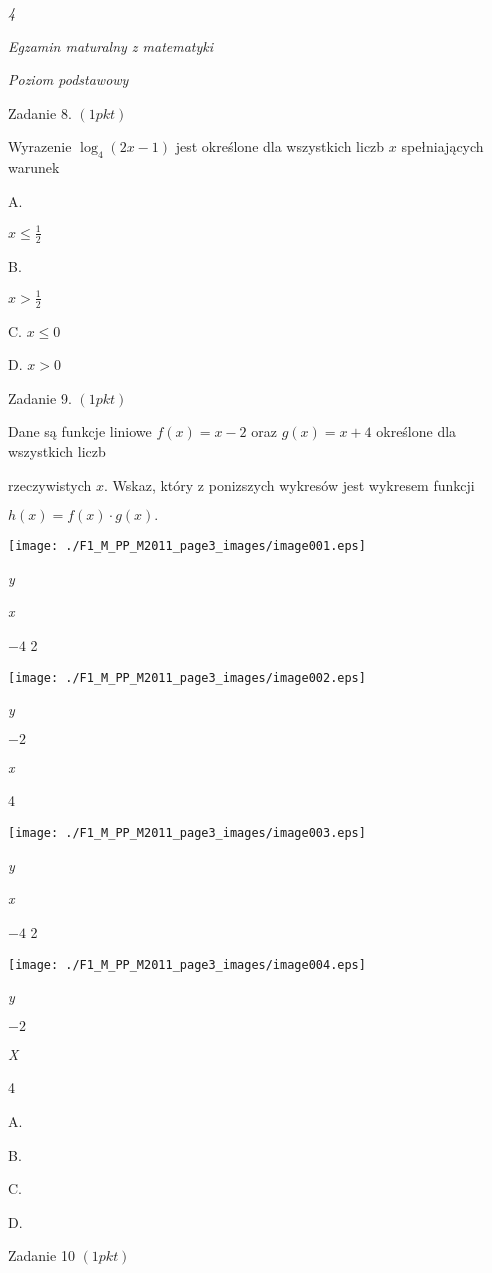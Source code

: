 \documentclass[a4paper,12pt]{article}
\begin{document}
{\it 4}

{\it Egzamin maturalny z matematyki}

{\it Poziom podstawowy}

Zadanie 8. $(1pkt)$

Wyrazenie $\log_{4}(2x-1)$ jest określone dla wszystkich liczb $x$ spełniających warunek

A.

$x\displaystyle \leq\frac{1}{2}$

B.

$x>\displaystyle \frac{1}{2}$

C. $x\leq 0$

D. $x>0$

Zadanie 9. $(1pkt)$

Dane są funkcje liniowe $f(x)=x-2$ oraz $g(x)=x+4$ określone dla wszystkich liczb

rzeczywistych $x$. Wskaz, który z ponizszych wykresów jest wykresem funkcji

$h(x)=f(x)\cdot g(x).$
\begin{center}
\texttt{[image: ./F1\_M\_PP\_M2011\_page3\_images/image001.eps]}
\end{center}
{\it y}

{\it x}

$-4$  2
\begin{center}
\texttt{[image: ./F1\_M\_PP\_M2011\_page3\_images/image002.eps]}
\end{center}
{\it y}

$-2$

{\it x}

4
\begin{center}
\texttt{[image: ./F1\_M\_PP\_M2011\_page3\_images/image003.eps]}
\end{center}
{\it y}

{\it x}

$-4$  2
\begin{center}
\texttt{[image: ./F1\_M\_PP\_M2011\_page3\_images/image004.eps]}
\end{center}
{\it y}

$-2$

{\it X}

4

A.

B.

C.

D.

Zadanie 10 $(1pkt)$
\end{document}
